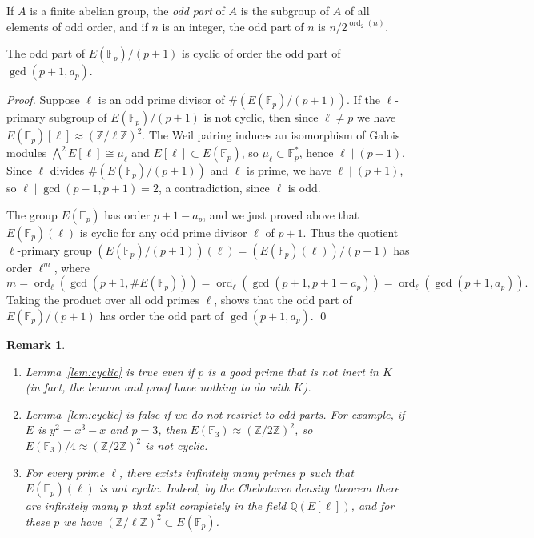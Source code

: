 \documentclass{oupau}
\DeclareMathOperator{\ord}{ord}
\newcommand{\isom}{\cong}
\newcommand{\FF}{\mathbb{F}}
\newcommand{\QQ}{\mathbb{Q}}
\newcommand{\ZZ}{\mathbb{Z}}
\newcommand{\ncisom}{\approx}   %
\newtheorem{remark}[theorem]{Remark}
\begin{document}
If $A$ is a finite abelian group, the {\em odd part} of $A$ is the
subgroup of $A$ of all elements of odd order, and if $n$ is an
integer, the odd part of $n$ is $n/2^{\ord_2(n)}$.
\begin{lemma}\label{lem:cyclic}
The odd part of $E(\FF_p)/(p+1)$ is cyclic of order the odd part of $\gcd(p+1,a_p)$.
\end{lemma}
\begin{proof}
  Suppose $\ell$ is an odd prime divisor of $\#(E(\FF_p)/(p+1))$.  If
  the $\ell$-primary subgroup of $E(\FF_p)/(p+1)$ is not cyclic, then
  since $\ell\neq p$ we have $E(\FF_p)[\ell] \ncisom (\ZZ/\ell\ZZ)^2$.
  The Weil pairing induces an isomorphism of Galois modules
  $\bigwedge^2 E[\ell] \isom \mu_{\ell}$ and $E[\ell] \subset
  E(\FF_p)$, so $\mu_{\ell}\subset \FF_p^*$, hence $\ell\mid (p-1)$.
  Since $\ell$ divides $\#(E(\FF_p)/(p+1))$ and $\ell$ is prime, we
  have $\ell\mid (p+1)$, so $\ell\mid\gcd(p-1,p+1) = 2$, a
  contradiction, since $\ell$ is odd.

  The group $E(\FF_p)$ has order $p+1-a_p$, and we just proved above
  that $E(\FF_p)(\ell)$ is cyclic for any odd prime divisor $\ell$ of $p+1$.  Thus the
  quotient $\ell$-primary group $(E(\FF_p)/(p+1))(\ell) =
  (E(\FF_p)(\ell))/(p+1)$ has order $\ell^{m}$, where
   $$m = \ord_{\ell}(\gcd(p+1,\#E(\FF_p)))
         =  \ord_{\ell}(\gcd(p+1,p+1-a_p))
         =  \ord_{\ell}(\gcd(p+1,a_p)).
  $$
  Taking the product over all odd primes $\ell$, shows that the odd
  part of $E(\FF_p)/(p+1)$ has order the odd part of $\gcd(p+1,a_p)$.
\qed\end{proof}
\begin{remark}
\begin{enumerate}
\item Lemma~\ref{lem:cyclic} is true even if $p$ is a good prime that
  is not inert in $K$ (in fact, the lemma and proof have nothing to do
  with $K$).
\item Lemma~\ref{lem:cyclic} is false if we do not restrict to odd parts.  For example,
if $E$ is $y^2=x^3 - x$ and $p=3$, then $E(\FF_3) \ncisom (\ZZ/2\ZZ)^2$, so
$E(\FF_3)/4 \ncisom (\ZZ/2\ZZ)^2$ is not cyclic. 
\item For every prime $\ell$, there exists infinitely many primes $p$ such that
$E(\FF_p)(\ell)$ is not cyclic.  Indeed, by the Chebotarev density theorem there
are infinitely many $p$ that split completely in the field $\QQ(E[\ell])$,
and for these $p$ we have $(\ZZ/\ell\ZZ)^2\subset E(\FF_p)$.
\end{enumerate}
\end{remark}
\end{document}
